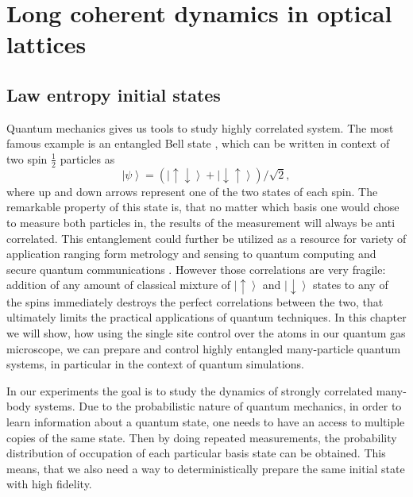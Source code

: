 \chapter{Long coherent dynamics in optical lattices}

\section{Law entropy initial states}
Quantum mechanics gives us tools to study highly correlated system. The most famous example is an entangled Bell state \cite{something}, which can be written in context of two spin $\frac{1}{2}$ particles as 
\begin{equation}
\left| \psi \right>=(\left| \uparrow \downarrow \right>+ \left| \downarrow \uparrow \right>)/\sqrt{2},
\end{equation}
where up and down arrows represent one of the two states of each spin. The remarkable property of this state is, that no matter which basis one would chose to measure both particles in, the results of the measurement will always be anti correlated. This entanglement could further be utilized as a resource for variety of application ranging form metrology and sensing \cite{sombody} to quantum computing \cite{Chuang book} and secure quantum communications \cite{something}. However those correlations are very fragile: addition of any amount of classical mixture of $\left| \uparrow \right>$ and $\left| \downarrow \right>$ states to any of the spins immediately destroys the perfect correlations between the two, that ultimately limits the practical applications of quantum techniques. In this chapter we will show, how using the single site control over the atoms in our quantum gas microscope, we can prepare and control highly entangled many-particle quantum systems, in particular in the context of quantum simulations. 

In our experiments the goal is to study the dynamics of strongly correlated many-body systems. Due to the probabilistic nature of quantum mechanics, in order to learn information about a quantum state, one needs to have an access to multiple copies of the same state. Then by doing repeated measurements, the probability distribution of occupation of each particular basis state can be obtained. This means, that we also need a way to deterministically prepare the same initial state with high fidelity. 

